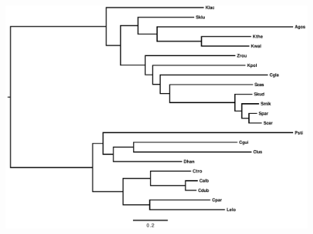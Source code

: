 \documentclass[12pt,draft]{article}
\begin{document}
\begin{figure}[H]
    \centering
	\includegraphics[width=.4\textwidth]{img/rokas_noBay_RAxML_bestTree_rooted}
    \caption{}
    \label{fig:tree_yeast}
\end{figure}
\end{document}

